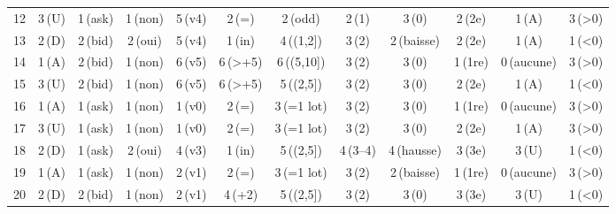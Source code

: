\begin{tabular}{rccccccccccc}
12 & 3\,{\tiny(U)} & 1\,{\tiny(ask)} & 1\,{\tiny(non)} & 5\,{\tiny(v4)} & 2\,{\tiny(=)} & 2\,{\tiny(odd)} & 2\,{\tiny(1)} & 3\,{\tiny(0)} & 2\,{\tiny(2e)} & 1\,{\tiny(A)} & 3\,{\tiny(>0)}\\
13 & 2\,{\tiny(D)} & 2\,{\tiny(bid)} & 2\,{\tiny(oui)} & 5\,{\tiny(v4)} & 1\,{\tiny(in)} & 4\,{\tiny((1,2])} & 3\,{\tiny(2)} & 2\,{\tiny(baisse)} & 2\,{\tiny(2e)} & 1\,{\tiny(A)} & 1\,{\tiny(<0)}\\
14 & 1\,{\tiny(A)} & 2\,{\tiny(bid)} & 1\,{\tiny(non)} & 6\,{\tiny(v5)} & 6\,{\tiny(>+5)} & 6\,{\tiny((5,10])} & 3\,{\tiny(2)} & 3\,{\tiny(0)} & 1\,{\tiny(1re)} & 0\,{\tiny(aucune)} & 3\,{\tiny(>0)}\\
15 & 3\,{\tiny(U)} & 2\,{\tiny(bid)} & 1\,{\tiny(non)} & 6\,{\tiny(v5)} & 6\,{\tiny(>+5)} & 5\,{\tiny((2,5])} & 3\,{\tiny(2)} & 3\,{\tiny(0)} & 2\,{\tiny(2e)} & 1\,{\tiny(A)} & 1\,{\tiny(<0)}\\
16 & 1\,{\tiny(A)} & 1\,{\tiny(ask)} & 1\,{\tiny(non)} & 1\,{\tiny(v0)} & 2\,{\tiny(=)} & 3\,{\tiny(=1 lot)} & 3\,{\tiny(2)} & 3\,{\tiny(0)} & 1\,{\tiny(1re)} & 0\,{\tiny(aucune)} & 3\,{\tiny(>0)}\\
17 & 3\,{\tiny(U)} & 1\,{\tiny(ask)} & 1\,{\tiny(non)} & 1\,{\tiny(v0)} & 2\,{\tiny(=)} & 3\,{\tiny(=1 lot)} & 3\,{\tiny(2)} & 3\,{\tiny(0)} & 2\,{\tiny(2e)} & 1\,{\tiny(A)} & 3\,{\tiny(>0)}\\
18 & 2\,{\tiny(D)} & 1\,{\tiny(ask)} & 2\,{\tiny(oui)} & 4\,{\tiny(v3)} & 1\,{\tiny(in)} & 5\,{\tiny((2,5])} & 4\,{\tiny(3–4)} & 4\,{\tiny(hausse)} & 3\,{\tiny(3e)} & 3\,{\tiny(U)} & 1\,{\tiny(<0)}\\
19 & 1\,{\tiny(A)} & 1\,{\tiny(ask)} & 1\,{\tiny(non)} & 2\,{\tiny(v1)} & 2\,{\tiny(=)} & 3\,{\tiny(=1 lot)} & 3\,{\tiny(2)} & 2\,{\tiny(baisse)} & 1\,{\tiny(1re)} & 0\,{\tiny(aucune)} & 3\,{\tiny(>0)}\\
20 & 2\,{\tiny(D)} & 2\,{\tiny(bid)} & 1\,{\tiny(non)} & 2\,{\tiny(v1)} & 4\,{\tiny(+2)} & 5\,{\tiny((2,5])} & 3\,{\tiny(2)} & 3\,{\tiny(0)} & 3\,{\tiny(3e)} & 3\,{\tiny(U)} & 1\,{\tiny(<0)}\\
\bottomrule
\end{tabular}